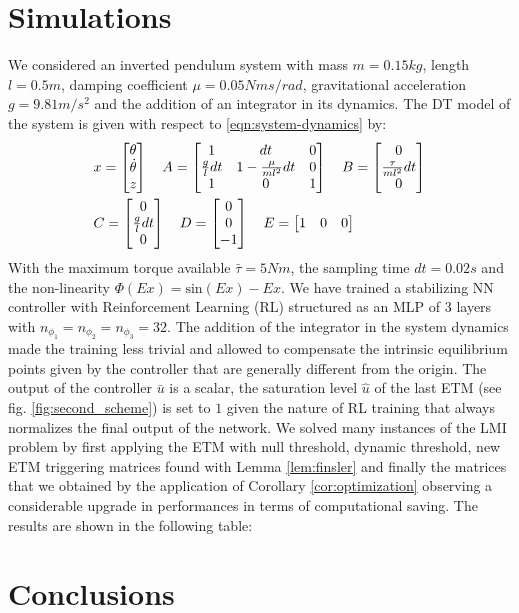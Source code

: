 \documentclass{ifacconf}
\theoremstyle{plain}
\begin{document}
\section{Simulations}
We considered an inverted pendulum system with mass $m = 0.15 kg$, length $l = 0.5 m$, damping coefficient $\mu = 0.05 N ms/rad$, gravitational acceleration $g = 9.81 m/s^2$ and the addition of an integrator in its dynamics. The DT model of the system is given with respect to \eqref{eqn:system-dynamics} by:
\begin{equation}\label{eqn:pendulum}
\begin{aligned}
  &x = \left[\begin{matrix}\theta \\ \dot{\theta} \\ z\end{matrix}\right] \quad 
  A = \left[\begin{matrix}1 & dt & 0\\
  \frac{g}{l} dt & 1 - \frac{\mu}{m l^2} dt & 0\\
  1 & 0 & 1\end{matrix}\right]\quad
  B = \left[\begin{matrix}0\\ \frac{\relax{\tau}}{m l^2} dt\\ 0\end{matrix}\right] \\
  &C = \left[\begin{matrix}0 \\ \frac{g}{l} dt \\ 0\end{matrix}\right] \quad
  D = \left[\begin{matrix}0 \\ 0 \\ -1\end{matrix}\right] \quad
  E = \left[\begin{matrix}1 & 0 & 0\end{matrix}\right]
\end{aligned}
\end{equation}
With the maximum torque available $\bar{\tau} = 5 N m$, the sampling time $dt = 0.02 s$ and the non-linearity $\Phi(Ex) = \text{sin}(Ex) - Ex$. We have trained a stabilizing NN controller with Reinforcement Learning (RL) structured as an MLP of $3$ layers with $n_{\phi_1} = n_{\phi_2} = n_{\phi_3} = 32$. The addition of the integrator in the system dynamics made the training less trivial and allowed to compensate the intrinsic equilibrium points given by the controller that are generally different from the origin. The output of the controller $\bar{u}$ is a scalar, the saturation level $\hat{u}$ of the last ETM (see fig. \ref{fig:second_scheme}) is set to $1$ given the nature of RL training that always normalizes the final output of the network. We solved many instances of the LMI problem by first applying the ETM with null threshold, dynamic threshold, new ETM triggering matrices found with Lemma \ref{lem:finsler} and finally the matrices that we obtained by the application of Corollary \ref{cor:optimization} observing a considerable upgrade in performances in terms of computational saving. The results are shown in the following table: 


{\color{red}{Troppo discorsivo?}}

\section{Conclusions}

%

\end{document}

